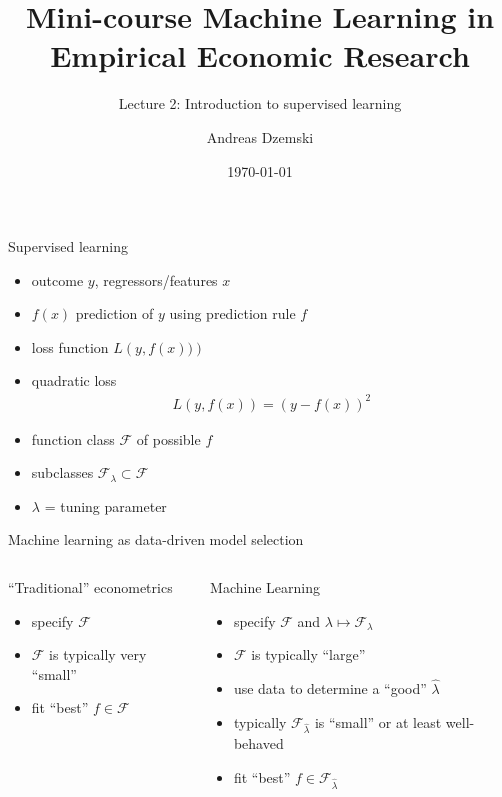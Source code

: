 \documentclass[xcolor=dvipsnames]{beamer}
\author[Dzemski]{Andreas Dzemski\inst{1}}
\institute{\inst{1} University of Gothenburg}
\title{Mini-course Machine Learning in Empirical Economic Research}
\subtitle{Lecture 2: Introduction to supervised learning}
\date{\today}
\begin{document}
\maketitle

\begin{frame}{Supervised learning}
\begin{itemize}
    \item outcome $y$, regressors/features $x$
    \item $f(x)$ prediction of $y$ using prediction rule $f$
    \item loss function $L\left(y, f(x))\right)$
    \item quadratic loss
    \begin{align*}
      L\left(y, f(x)\right) =  \left(y - f(x) \right)^2 
    \end{align*}
    \item function class $\mathcal{F}$ of possible $f$
    \item subclasses $\mathcal{F}_{\lambda} \subset \mathcal{F}$
    \item $\lambda$ = tuning parameter
  \end{itemize}  
\end{frame}

\begin{frame}{Machine learning as data-driven model selection}
\begin{columns}[t, onlytextwidth]
        \begin{block}{``Traditional'' econometrics}
        \begin{itemize}
          \item 
          specify $\mathcal{F}$
          \item 
          $\mathcal{F}$ is typically very ``small''
          \item 
          fit ``best'' $f \in \mathcal{F}$
        \end{itemize}
        \end{block}
        \begin{block}{Machine Learning}
        \begin{itemize}
          \item 
          specify $\mathcal{F}$ and $\lambda \mapsto \mathcal{F}_{\lambda}$
          \item 
          $\mathcal{F}$ is typically ``large''
          \item 
          use data to determine a ``good'' $\hat{\lambda}$
          \item
          typically $\mathcal{F}_{\hat{\lambda}}$ is ``small'' or at least well-behaved
          \item 
          fit ``best'' $f \in \mathcal{F}_{\hat{\lambda}}$
        \end{itemize}
      \end{block}
\end{columns}
\end{frame}
\end{document}

